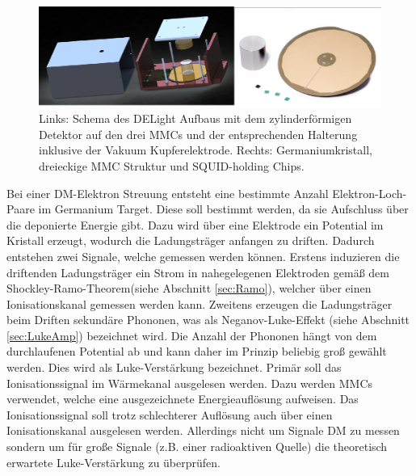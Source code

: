 \begin{figure}[!b]
\begin{center}
\includegraphics[width=\textwidth]{./fig/Antrag-DELight-extract.pdf}
\vspace{-0.5cm}
\caption{Links: Schema des DELight Aufbaus mit dem zylinderförmigen Detektor auf den drei MMCs und der entsprechenden Halterung inklusive der Vakuum Kupferelektrode. Rechts: Germaniumkristall, dreieckige MMC Struktur und SQUID-holding Chips.}
\label{fig:DELightAufbau}
\end{center}
\end{figure}
Bei einer DM-Elektron Streuung entsteht eine bestimmte Anzahl Elektron-Loch-Paare im Germanium Target.
Diese soll bestimmt werden, da sie Aufschluss über die deponierte Energie gibt.
Dazu wird über eine Elektrode ein Potential im Kristall erzeugt, wodurch die Ladungsträger anfangen zu driften.
Dadurch entstehen zwei Signale, welche gemessen werden können.
Erstens induzieren die driftenden Ladungsträger ein Strom in nahegelegenen Elektroden gemäß dem Shockley-Ramo-Theorem\cite{Ramo1939}(siehe Abschnitt \ref{sec:Ramo}), welcher über einen Ionisationskanal gemessen werden kann.
Zweitens erzeugen die Ladungsträger beim Driften sekundäre Phononen, was als Neganov-Luke-Effekt\cite{Luke1988} (siehe Abschnitt \ref{sec:LukeAmp}) bezeichnet wird.
Die Anzahl der Phononen hängt von dem durchlaufenen Potential ab und kann daher im Prinzip beliebig groß gewählt werden.
Dies wird als Luke-Verstärkung bezeichnet.
Primär soll das Ionisationssignal im Wärmekanal ausgelesen werden.
Dazu werden  \acp{MMC}\cite{Fleischmann2009, Enss2005} verwendet, welche eine ausgezeichnete Energieauflösung aufweisen.
Das Ionisationssignal soll trotz schlechterer Auflösung auch über einen Ionisationskanal ausgelesen werden.
Allerdings nicht um Signale DM zu messen sondern um für große Signale (z.B. einer radioaktiven Quelle) die theoretisch erwartete Luke-Verstärkung zu überprüfen.

